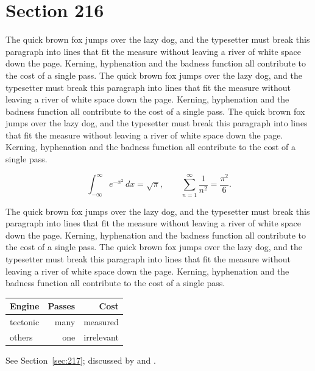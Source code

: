 \documentclass{article}
\begin{document}
\section{Section 216}
\label{sec:216}
The quick brown fox jumps over the lazy dog, and the typesetter must break this paragraph into lines that fit the measure without leaving a river of white space down the page. Kerning, hyphenation and the badness function all contribute to the cost of a single pass. The quick brown fox jumps over the lazy dog, and the typesetter must break this paragraph into lines that fit the measure without leaving a river of white space down the page. Kerning, hyphenation and the badness function all contribute to the cost of a single pass. The quick brown fox jumps over the lazy dog, and the typesetter must break this paragraph into lines that fit the measure without leaving a river of white space down the page. Kerning, hyphenation and the badness function all contribute to the cost of a single pass. 

\begin{equation}\label{eq:216}
\int_{-\infty}^{\infty} e^{-x^{2}}\,dx = \sqrt{\pi}, \qquad
\sum_{n=1}^{\infty} \frac{1}{n^{2}} = \frac{\pi^{2}}{6}.
\end{equation}

The quick brown fox jumps over the lazy dog, and the typesetter must break this paragraph into lines that fit the measure without leaving a river of white space down the page. Kerning, hyphenation and the badness function all contribute to the cost of a single pass. The quick brown fox jumps over the lazy dog, and the typesetter must break this paragraph into lines that fit the measure without leaving a river of white space down the page. Kerning, hyphenation and the badness function all contribute to the cost of a single pass. 

\begin{center}
\begin{tabular}{lrr}
\toprule
Engine & Passes & Cost \\
\midrule
tectonic & many & measured \\
others & one & irrelevant \\
\bottomrule
\end{tabular}
\end{center}

See Section~\ref{sec:217}; discussed by \textcite{k2} and \textcite{l4}.
\end{document}
